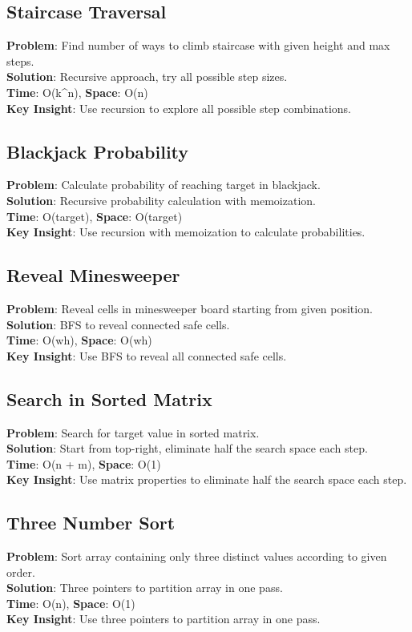 \documentclass{report}
\begin{document}
\subsection{Staircase Traversal}
\textbf{Problem}: Find number of ways to climb staircase with given height and max steps.\\
\textbf{Solution}: Recursive approach, try all possible step sizes.\\
\textbf{Time}: O(k\textasciicircum n), \textbf{Space}: O(n)\\
\textbf{Key Insight}: Use recursion to explore all possible step combinations.

\subsection{Blackjack Probability}
\textbf{Problem}: Calculate probability of reaching target in blackjack.\\
\textbf{Solution}: Recursive probability calculation with memoization.\\
\textbf{Time}: O(target), \textbf{Space}: O(target)\\
\textbf{Key Insight}: Use recursion with memoization to calculate probabilities.

\subsection{Reveal Minesweeper}
\textbf{Problem}: Reveal cells in minesweeper board starting from given position.\\
\textbf{Solution}: BFS to reveal connected safe cells.\\
\textbf{Time}: O(wh), \textbf{Space}: O(wh)\\
\textbf{Key Insight}: Use BFS to reveal all connected safe cells.

\subsection{Search in Sorted Matrix}
\textbf{Problem}: Search for target value in sorted matrix.\\
\textbf{Solution}: Start from top-right, eliminate half the search space each step.\\
\textbf{Time}: O(n + m), \textbf{Space}: O(1)\\
\textbf{Key Insight}: Use matrix properties to eliminate half the search space each step.

\subsection{Three Number Sort}
\textbf{Problem}: Sort array containing only three distinct values according to given order.\\
\textbf{Solution}: Three pointers to partition array in one pass.\\
\textbf{Time}: O(n), \textbf{Space}: O(1)\\
\textbf{Key Insight}: Use three pointers to partition array in one pass.
\end{document}
